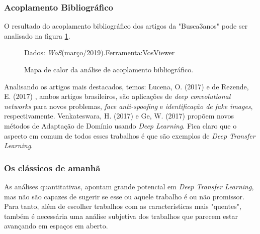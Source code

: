 \documentclass[sigconf]{acmart}
\newcommand{\source}[2]{\raggedleft{}\vspace*{-7mm}\caption*{ \textmd{\scriptsize{Dados: {#1}.\hfill Ferramenta:{#2}}}}}
\begin{document}
  \subsubsection{Acoplamento Bibliográfico}
  O resultado do acoplamento bibliográfico dos artigos da "Busca3anos" pode ser analisado na figura \ref{fig:bicoupling}.
  \begin{figure}[b]
    \source{\emph{WoS}(março/2019)}{VosViewer}
    \caption{Mapa de calor da análise de acoplamento bibliográfico.} \label{fig:bicoupling}
  \end{figure}

  Analisando os artigos mais destacados, temos:
  Lucena, O. (2017) \cite{Lucena2017} e de Rezende, E. (2017) \cite{Rezende2017}, ambos artigos brasileiros, são aplicações de \emph{deep convolutional networks} para novos problemas, \emph{face anti-spoofing} e \emph{identificação de fake images}, respectivamente.
  Venkateswara, H. (2017) \cite{Venkateswara2017} e Ge, W. (2017)\cite{Ge2017} propõem novos métodos de Adaptação de Domínio usando \emph{Deep Learning}. 
  Fica claro que o aspecto em comum de todos esses trabalhos é que são exemplos de \emph{Deep Transfer Learning}.

  \subsubsection{Os clássicos de amanhã}
  As análises quantitativas, apontam grande potencial em \emph{Deep Transfer Learning}, mas não são capazes de sugerir se esse ou aquele trabalho é ou não promissor.  Para tanto, além de escolher trabalhos com as características mais "quentes", também é necessária uma análise subjetiva dos trabalhos que parecem estar avançando em espaços em aberto. 
  
\end{document}
